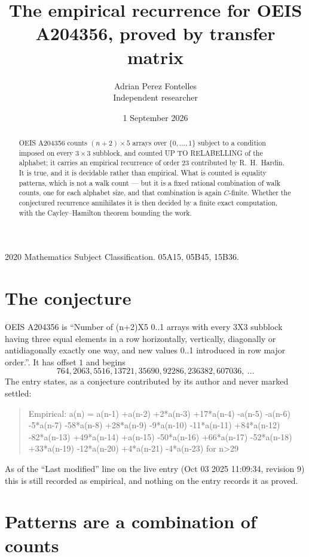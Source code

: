 \documentclass[11pt,a4paper]{article}
\title{The empirical recurrence for OEIS A204356, proved by transfer matrix}
\author{Adrian Perez Fontelles\\ \small Independent researcher}
\date{1 September 2026}
\theoremstyle{plain}
\theoremstyle{definition}
\begin{document}
\maketitle

\begin{abstract}
OEIS A204356 counts $(n+2)\times5$ arrays over $\{0,\dots,1\}$ subject to a condition imposed on
every $3\times3$ subblock, and counted UP TO RELABELLING of the
alphabet; it carries an empirical recurrence of order $23$ contributed by
R.~H.~Hardin. It is true, and it is decidable rather than empirical. What is counted is
equality patterns, which is not a walk count --- but it is a fixed rational combination of
walk counts, one for each alphabet size, and that combination is again $C$-finite. Whether the
conjectured recurrence annihilates it is then decided by a finite exact computation, with the
Cayley--Hamilton theorem bounding the work.
\end{abstract}

\noindent\small 2020 Mathematics Subject Classification. 05A15, 05B45, 15B36.\normalsize

\section{The conjecture}

OEIS A204356 is ``Number of (n+2)X5 0..1 arrays with every 3X3 subblock having three equal elements in a row horizontally, vertically, diagonally or antidiagonally exactly one way, and new values 0..1 introduced in row major order.''. It has offset $1$ and begins
\[
764, 2063, 5516, 13721, 35690, 92286, 236382, 607036,\ \dots
\]
The entry states, as a conjecture contributed by its author and never marked settled:
\begin{quote}
Empirical: a(n) = a(n-1) +a(n-2) +2*a(n-3) +17*a(n-4) -a(n-5) -a(n-6) -5*a(n-7) -58*a(n-8) +28*a(n-9) -9*a(n-10) -11*a(n-11) +84*a(n-12) -82*a(n-13) +49*a(n-14) +a(n-15) -50*a(n-16) +66*a(n-17) -52*a(n-18) +33*a(n-19) -12*a(n-20) +4*a(n-21) -4*a(n-23) for n>29
\end{quote}
As of the ``Last modified'' line on the live entry (Oct 03 2025 11:09:34, revision 9) this is still
recorded as empirical, and nothing on the entry records it as proved.

\section{Patterns are a combination of counts}
\end{document}
